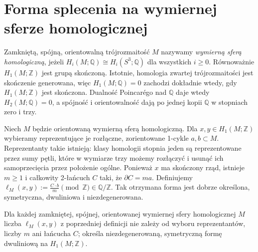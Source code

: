 \section{Forma splecenia na wymiernej sferze homologicznej}
\label{sec:kt-linking-pairing}

\begin{definicja}
Zamkniętą, spójną, orientowalną trójrozmaitość $M$
nazywamy \emph{wymierną sferą homologiczną}, jeżeli
$H_i(M;\mathbb Q)\cong H_i(S^3;\mathbb Q)$
dla wszystkich $i\geq0$. Równoważnie $H_1(M;\mathbb Z)$
jest grupą skończoną. Istotnie, homologia zwartej
trójrozmaitości jest skończenie generowana, więc
$H_1(M;\mathbb Q)=0$ zachodzi dokładnie wtedy, gdy
$H_1(M;\mathbb Z)$ jest skończona. Dualność Poincarégo
nad $\mathbb Q$ daje wtedy $H_2(M;\mathbb Q)=0$,
a spójność i orientowalność dają po jednej kopii
$\mathbb Q$ w stopniach zero i trzy.
\end{definicja}

\begin{definicja}
Niech $M$ będzie orientowaną wymierną sferą homologiczną.
Dla $x,y\in H_1(M;\mathbb Z)$ wybieramy reprezentujące
je rozłączne, zorientowane 1-cykle $a,b\subset M$.
Reprezentanty takie istnieją: klasy homologii stopnia
jeden są reprezentowane przez sumy pętli, które
w wymiarze trzy możemy rozłączyć i usunąć ich
samoprzecięcia przez położenie ogólne.
Ponieważ $x$ ma skończony rząd, istnieje $m\geq1$
i całkowity 2-łańcuch $C$ taki, że $\partial C=ma$.
Definiujemy
$\ell_M(x,y):=\frac{C\cdot b}{m}\pmod{\mathbb Z}
\in\mathbb Q/\mathbb Z$.
Tak otrzymana forma jest dobrze określona, symetryczna,
dwuliniowa i niezdegenerowana.
\end{definicja}

\begin{stwierdzenie}
Dla każdej zamkniętej, spójnej, orientowanej wymiernej
sfery homologicznej $M$ liczba $\ell_M(x,y)$ z poprzedniej
definicji nie zależy od wyboru reprezentantów, liczby $m$
ani łańcucha $C$; określa niezdegenerowaną, symetryczną
formę dwuliniową na $H_1(M;\mathbb Z)$.
\end{stwierdzenie}

